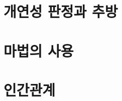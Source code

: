 \documentclass{report}
\begin{document}
	
	\section{개연성 판정과 추방}
		
	
	\section{마법의 사용}
		
	
	\section{인간관계}
		
	
\end{document}
